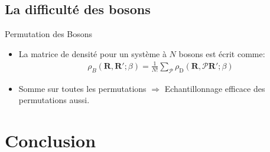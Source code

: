 \documentclass{beamer}
\begin{document}
\subsection{La difficulté des bosons}
    
\begin{frame}{Permutation des Bosons}
\begin{itemize}
    \item 
    La matrice de densité pour un système à $N$ bosons est écrit comme: 
    \begin{align} 
        \label{densite_boson}
        \rho_{B}( \mathbf{R}, \mathbf{R}'; \beta) = \frac{1}{N!}\sum_{\mathcal{P}} \rho_{\mathrm{D}} (\mathbf{R}, \mathcal{P} \mathbf{R}'; \beta)
    \end{align}
    
    \item 
    Somme sur toutes les permutations $\Rightarrow$ Echantillonnage efficace des permutations aussi.
\end{itemize}
    
\end{frame}



\section{Conclusion}
\end{document}

